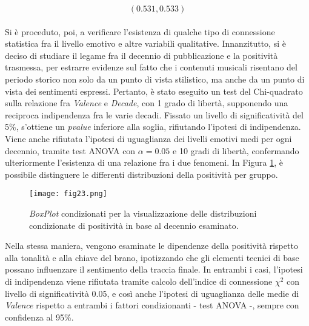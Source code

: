 \documentclass[fleqn,10pt]{SelfArx} %
\begin{document}
\begin{equation}
    (0.531, 0.533)
\end{equation}
\\
Si è proceduto, poi, a verificare l'esistenza di qualche tipo di connessione statistica fra il livello emotivo e altre variabili qualitative. Innanzitutto, si è deciso di studiare il legame fra il decennio di pubblicazione e la positività trasmessa, per estrarre evidenze sul fatto che i contenuti musicali risentano del periodo storico non solo da un punto di vista stilistico, ma anche da un punto di vista dei sentimenti espressi. Pertanto, è stato eseguito un test del Chi-quadrato sulla relazione fra \textit{Valence} e \textit{Decade}, con 1 grado di libertà, supponendo una reciproca indipendenza fra le varie decadi. Fissato un livello di significatività del 5\%, s'ottiene un \textit{pvalue} inferiore alla soglia, rifiutando l'ipotesi di indipendenza. Viene anche rifiutata l'ipotesi di uguaglianza dei livelli emotivi medi per ogni decennio, tramite test ANOVA con $\alpha=0.05$ e 10 gradi di libertà, confermando ulteriormente l'esistenza di una relazione fra i due fenomeni. In Figura \ref{fig:fig23}, è possibile distinguere le differenti distribuzioni della positività per gruppo. 
\begin{figure}[H]
    \centering
    \texttt{[image: fig23.png]}
    \label{fig:fig23}
    \caption{\textit{BoxPlot} condizionati per la visualizzazione delle distribuzioni condizionate di positività in base al decennio esaminato.}
\end{figure}
Nella stessa maniera, vengono esaminate le dipendenze della positività rispetto alla tonalità e alla chiave del brano, ipotizzando che gli elementi tecnici di base possano influenzare il sentimento della traccia finale. In entrambi i casi, l'ipotesi di indipendenza viene rifiutata tramite calcolo dell'indice di connessione $\chi^2$ con livello di significatività 0.05, e così anche l'ipotesi di uguaglianza delle medie di \textit{Valence} rispetto a entrambi i fattori condizionanti - test ANOVA -, sempre con confidenza al 95\%.
\end{document}

